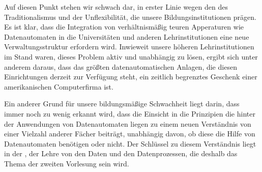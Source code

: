 {Auf diesen Punkt stehen wir schwach dar, in erster Linie wegen den des Traditionalismus und der Unflexibilität, die unsere Bildungsinstitutionen prägen. Es ist klar, dass die Integration von verhältnismäßig teuren Apperaturen wie Datenautomaten in die Universitäten und anderen Lehrinstitutionen eine neue Verwaltungsstruktur erfordern wird. Inwieweit unsere höheren Lehrinstitutionen im Stand waren, dieses Problem aktiv und unabhängig zu lösen, ergibt sich unter anderem daraus, dass das größten datenautomatischen Anlagen, die diesen Einrichtungen derzeit zur Verfügung steht, ein zeitlich begrenztes Geschenk einer amerikanischen Computerfirma ist. 

Ein anderer Grund für unsere bildungsmäßige Schwachheit liegt darin, dass immer noch zu wenig erkannt wird, dass die Einsicht in die Prinzipien die hinter der Anwendungen von Datenautomaten liegen zu einem neuen Verständnis von einer Vielzahl anderer Fächer beiträgt, unabhängig davon, ob diese die Hilfe von Datenautomaten benötigen oder nicht. Der Schlüssel zu diesem Verständnis liegt in der , der Lehre von den Daten und den Datenprozessen, die deshalb das Thema der zweiten Vorlesung sein wird.
}
